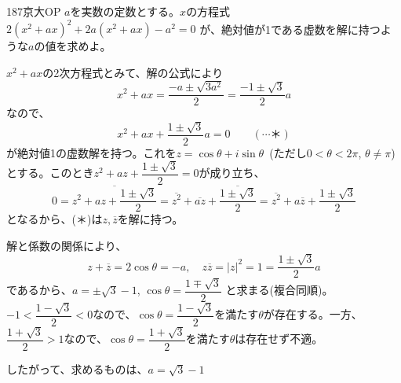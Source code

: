\begin{prob}{187}{}{京大OP}
 $a$を実数の定数とする。$x$の方程式 $2(x^2+ax)^2+2a(x^2+ax)-a^2=0$ が、絶対値が1である虚数を解に持つような$a$の値を求めよ。
\end{prob}
$x^2+ax$の2次方程式とみて、解の公式により
\[ x^2+ax=\frac{-a\pm\sqrt{3a^2}}{2}=\frac{-1\pm\sqrt{3}}{2}a \]
なので、
\[ x^2+ax+\frac{1\pm\sqrt{3}}{2}a=0 \qquad (\cdots \text{＊}) \]
が絶対値1の虚数解を持つ。これを$z=\cos\theta+i\sin\theta$~(ただし$0<\theta<2\pi$, $\theta\neq\pi$)とする。このとき$z^2+az+\dfrac{1\pm\sqrt{3}}{2}=0$が成り立ち、
\[ 0=\overline{z^2+az+\frac{1\pm\sqrt{3}}{2}}=\overline{z^2}+\overline{az}+\overline{\frac{1\pm\sqrt{3}}{2}}=\overline{z^2}+a\overline{z}+\frac{1\pm\sqrt{3}}{2} \]
となるから、(＊)は$z, \overline{z}$を解に持つ。

解と係数の関係により、
\[ z+\overline{z}=2\cos\theta=-a,\quad z\overline{z}=|z|^2=1=\frac{1\pm\sqrt{3}}{2}a \]
であるから、$a=\pm\sqrt{3}-1$, $\cos\theta=\dfrac{1\mp\sqrt{3}}{2}$ と求まる(複合同順)。$-1<\dfrac{1-\sqrt{3}}{2}<0$なので、$\cos\theta=\dfrac{1-\sqrt{3}}{2}$を満たす$\theta$が存在する。一方、$\dfrac{1+\sqrt{3}}{2}>1$なので、$\cos\theta=\dfrac{1+\sqrt{3}}{2}$を満たす$\theta$は存在せず不適。

したがって、求めるものは、$a=\sqrt{3}-1$